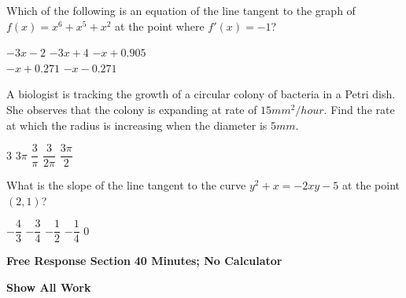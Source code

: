 \begin{questions}
    \newpage

    \question Which of the following is an equation of the line tangent to the graph of $f(x) = x^6 + x^5 + x^2$ at the point where $f'(x) = -1$? \\

    \begin{oneparchoices}
        \choice $-3x - 2$
        \choice $-3x + 4$
        \choice $-x + 0.905$ \\[11pt]
        \makebox[0.23 \textwidth] \choice $-x + 0.271$
        \makebox[0.27 \textwidth]\choice $-x - 0.271$
    \end{oneparchoices} \par \horizontalline

    \question A biologist is tracking the growth of a circular colony of bacteria in a Petri dish. She observes that the colony is expanding at rate of $15 \si{mm^2 \per hour}$. Find the rate at which the radius is increasing when the diameter is $5 \si{mm}$. \\

    \begin{oneparchoices}
        \choice $3$
        \choice $3\pi$
        \choice $\dfrac{3}{\pi}$
        \choice $\dfrac{3}{2\pi}$
        \choice $\dfrac{3\pi}{2}$
    \end{oneparchoices} \par \horizontalline

    \question What is the slope of the line tangent to the curve $y^2 + x = -2xy - 5$ at the point $(2, 1)$? \\

    \begin{oneparchoices}
        \choice $-\dfrac{4}{3}$
        \choice $-\dfrac{3}{4}$
        \choice $-\dfrac{1}{2}$
        \choice $-\dfrac{1}{4}$
        \choice $0$
    \end{oneparchoices} \par \horizontalline
\end{questions}

\newpage
{}

\textbf{Free Response Section} \hfill \textbf{40 Minutes; No Calculator} \\[11pt]

\begin{center}
    \textbf{Show All Work}
\end{center}
\vspace{11pt}

